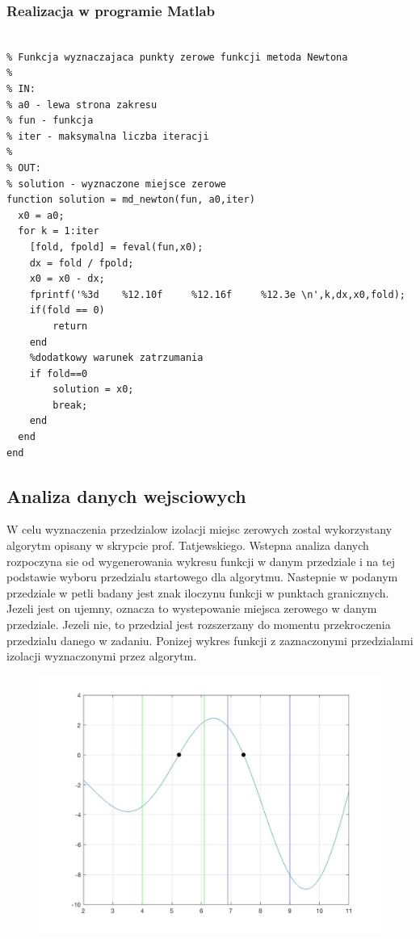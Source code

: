 \documentclass[polish, 11pt, oneside]{article}   	%
\begin{document}
\subsubsection{Realizacja w programie Matlab}
\begin{lstlisting}[caption=Implementacja metody Newtona]

% Funkcja wyznaczajaca punkty zerowe funkcji metoda Newtona
%
% IN:
% a0 - lewa strona zakresu
% fun - funkcja 
% iter - maksymalna liczba iteracji
%
% OUT:
% solution - wyznaczone miejsce zerowe
function solution = md_newton(fun, a0,iter)
  x0 = a0; 
  for k = 1:iter
    [fold, fpold] = feval(fun,x0); 
    dx = fold / fpold; 
    x0 = x0 - dx;
    fprintf('%3d	%12.10f     %12.16f     %12.3e \n',k,dx,x0,fold);
    if(fold == 0)
        return
    end
    %dodatkowy warunek zatrzumania
	if fold==0 
        solution = x0;
        break; 
    end
  end
end

\end{lstlisting}


\subsection{Analiza danych wejsciowych}
W celu wyznaczenia przedzialow izolacji miejsc zerowych zostal wykorzystany algorytm opisany w skrypcie prof. Tatjewskiego. Wstepna analiza danych rozpoczyna sie od wygenerowania wykresu funkcji w danym przedziale i na tej podstawie wyboru przedzialu startowego dla algorytmu. Nastepnie w podanym przedziale w petli badany jest znak iloczynu funkcji w punktach granicznych. Jezeli jest on ujemny, oznacza to wystepowanie miejsca zerowego w danym przedziale. Jezeli nie, to przedzial jest rozszerzany do momentu przekroczenia przedzialu danego w zadaniu. 
Ponizej wykres funkcji z zaznaczonymi przedzialami izolacji wyznaczonymi przez algorytm. 

\begin{figure}[h]
\includegraphics[width=\textwidth]{figure1.jpg}
\end{figure}
\end{document}
